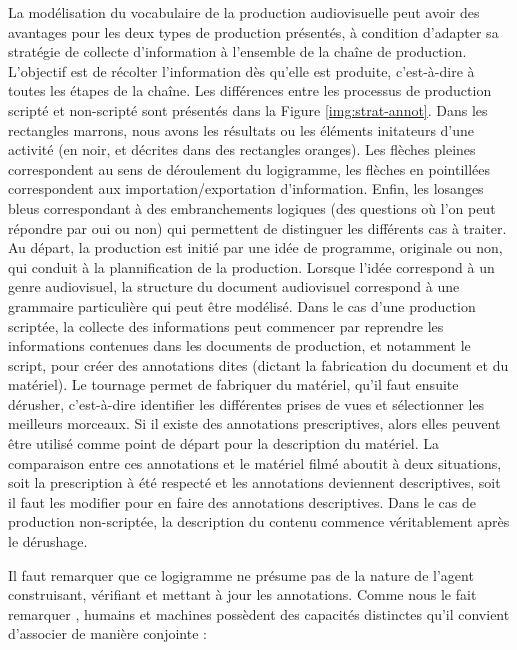 La modélisation du vocabulaire de la production audiovisuelle peut avoir des avantages pour les deux types de production présentés, à condition d'adapter sa stratégie de collecte d'information à l'ensemble de la chaîne de production. 
L'objectif est de récolter l'information dès qu'elle est produite, c'est-à-dire à toutes les étapes de la chaîne. 
Les différences entre les processus de production scripté et non-scripté sont présentés dans la Figure \ref{img:strat-annot}. 
Dans les rectangles marrons, nous avons les résultats ou les éléments initateurs d'une activité (en noir, et décrites dans des rectangles oranges).
Les flèches pleines correspondent au sens de déroulement du logigramme, les flèches en pointillées correspondent aux importation/exportation d'information. 
Enfin, les losanges bleus correspondant à des embranchements logiques (des questions où l'on peut répondre par oui ou non) qui permettent de distinguer les différents cas à traiter.
Au départ, la production est initié par une idée de programme, originale ou non, qui conduit à la plannification de la production.
Lorsque l'idée correspond à un genre audiovisuel, la structure du document audiovisuel correspond à une grammaire particulière qui peut être modélisé. 
Dans le cas d'une production scriptée, la collecte des informations peut commencer par reprendre les informations contenues dans les documents de production, et notamment le script, pour créer des annotations dites  (dictant la fabrication du document et du matériel).
Le tournage permet de fabriquer du matériel, qu'il faut ensuite dérusher, c'est-à-dire identifier les différentes prises de vues et sélectionner les meilleurs morceaux. 
Si il existe des annotations prescriptives, alors elles peuvent être utilisé comme point de départ pour la description du matériel.
La comparaison entre ces annotations et le matériel filmé aboutit à deux situations, soit la prescription à été respecté et les annotations deviennent descriptives, soit il faut les modifier pour en faire des annotations descriptives.
Dans le cas de production non-scriptée, la description du contenu commence véritablement après le dérushage.

Il faut remarquer que ce logigramme ne présume pas de la nature de l'agent construisant, vérifiant et mettant à jour les annotations.
Comme nous le fait remarquer \citeauthor{latour:ia}, humains et machines possèdent des capacités distinctes qu'il convient d'associer de manière conjointe :

\begin{cico}
 
\end{cico} 

